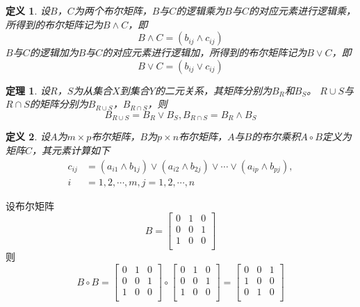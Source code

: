\documentclass{book}[oneside]
\newtheorem{Def}{定义}[chapter]
\newtheorem{Thm}{定理}[chapter]
\begin{document}
\begin{CJK*}{UTF8}{gbsn}
   \begin{Def}
    设$B$，$C$为两个布尔矩阵，$B$与$C$的逻辑乘为$B$与$C$的对应元素进行逻辑乘，所得到的布尔矩阵记为$B \land C$，即
    \begin{equation*}
      B \land C = (b_{ij} \land c_{ij})
    \end{equation*}
    $B$与$C$的逻辑加为$B$与$C$的对应元素进行逻辑加，所得到的布尔矩阵记为$B \lor C$，即
    \begin{equation*}
      B \lor C = (b_{ij} \lor c_{ij})
    \end{equation*}
  \end{Def}
  \begin{Thm}
    设$R$，$S$为从集合$X$到集合$Y$的二元关系，其矩阵分别为$B_R$和$B_S$。 $R\cup S$与$R \cap S$的矩阵分别为$B_{R\cup S}$，$B_{R\cap S}$，则
    \begin{equation*}
      B_{R\cup S}=B_R \lor B_S, B_{R\cap S}=B_R \land B_S
    \end{equation*}
  \end{Thm}
  \begin{Def}
    设$A$为$m\times p$布尔矩阵，$B$为$p \times n$布尔矩阵，$A$与$B$的布尔乘积$A \circ B$定义为矩阵$C$，其元素计算如下
    \begin{align*}
      c_{ij} &= (a_{i1}\land b_{1j}) \lor (a_{i2} \land b_{2j}) \lor \cdots \lor (a_{ip} \land b_{pj}), \\
      i &= 1,2,\cdots, m, j = 1,2,\cdots, n
    \end{align*}
  \end{Def}
  设布尔矩阵
  \[B=\begin{bmatrix}
    0&1&0\\
    0&0&1\\
    1&0&0\\
  \end{bmatrix}
\]
则
\[B\circ B=\begin{bmatrix}
  0&1&0\\
  0&0&1\\
  1&0&0\\
\end{bmatrix}
\circ
\begin{bmatrix}
  0&1&0\\
  0&0&1\\
  1&0&0\\
\end{bmatrix}
=\begin{bmatrix}
  0&0&1\\
  1&0&0\\
  0&1&0\\
\end{bmatrix}\]


\end{CJK*}
\end{document}
